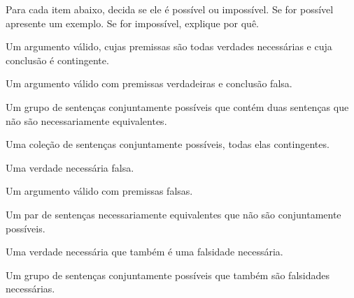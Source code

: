 \problempart
Para cada item abaixo, decida se ele é possível ou impossível.
Se for possível apresente um exemplo.
Se for impossível, explique por quê.
\begin{earg}
\item Um argumento válido, cujas premissas são todas verdades necessárias e cuja conclusão é contingente.
\item Um argumento válido com premissas verdadeiras e conclusão falsa.
\item Um grupo de sentenças conjuntamente possíveis que contém duas sentenças que não são necessariamente equivalentes.
\item Uma coleção de sentenças conjuntamente possíveis, todas elas contingentes.
\item Uma verdade necessária falsa.
\item Um argumento válido com premissas falsas.
\item Um par de sentenças necessariamente equivalentes que não são conjuntamente possíveis.
\item Uma verdade necessária que também é uma falsidade necessária.
\item Um grupo de sentenças conjuntamente possíveis que também são falsidades necessárias.
\end{earg}

